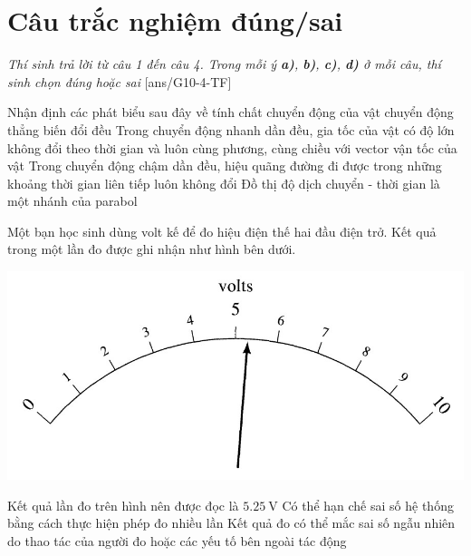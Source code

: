 \section{Câu trắc nghiệm đúng/sai} 
\textit{Thí sinh trả lời từ câu 1 đến câu 4. Trong mỗi ý \textbf{a)}, \textbf{b)}, \textbf{c)}, \textbf{d)} ở mỗi câu, thí sinh chọn đúng hoặc sai}
\setcounter{ex}{0}
[ans/G10-4-TF]
\begin{ex}
Nhận định các phát biểu sau đây về tính chất chuyển động của vật chuyển động thẳng biến đổi đều	
	{\True Trong chuyển động nhanh dần đều, gia tốc của vật có độ lớn không đổi theo thời gian và luôn cùng phương, cùng chiều với vector vận tốc của vật}
	{Trong chuyển động chậm dần đều, hiệu quãng đường đi được trong những khoảng thời gian liên tiếp luôn không đổi}
	{\True Đồ thị độ dịch chuyển - thời gian là một nhánh của parabol}
	\loigiai{}
\end{ex}
\begin{ex}
	Một bạn học sinh dùng volt kế để đo hiệu điện thế hai đầu điện trở. Kết quả trong một lần đo được ghi nhận như hình bên dưới.
	\begin{center}
		\includegraphics[width=0.6\linewidth]{../figs/D10-2-3}
	\end{center}
	{Kết quả lần đo trên hình nên được đọc là $\SI{5.25}{\volt}$}
	{Có thể hạn chế sai số hệ thống bằng cách thực hiện phép đo nhiều lần}
	{\True Kết quả đo có thể mắc sai số ngẫu nhiên do thao tác của người đo hoặc các yếu tố bên ngoài tác động}
\end{ex}
